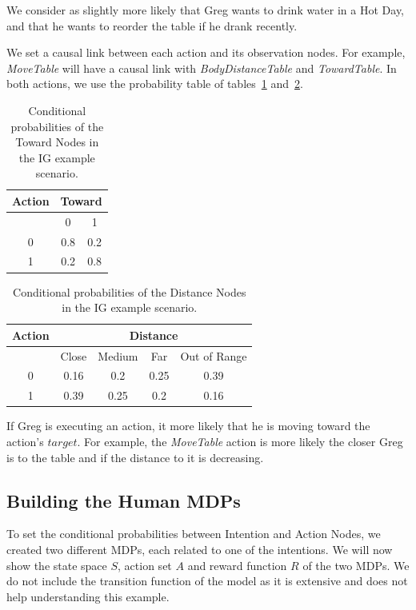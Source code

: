 We consider as slightly more likely that Greg wants to drink water in a Hot Day, and that he wants to reorder the table if he drank recently.

We set a causal link between each action and its observation nodes. For example, \textit{MoveTable} will have a causal link with \textit{BodyDistanceTable} and \textit{TowardTable}. In both actions, we use the probability table of tables~\ref{table:intention-ig_toward} and~\ref{table:intention-ig_distance}.

 \begin{table}[h!]
\centering
\begin{tabular}{|c|c|c|}
\hline
Action & \multicolumn{2}{|c|}{Toward} \\ \hline \hline
& 0 & 1 \\ \hline
0  & 0.8 & 0.2 \\ \hline
1 & 0.2 & 0.8 \\  \hline
\end{tabular}
\caption{Conditional probabilities of the Toward Nodes in the IG example scenario.}
 \label{table:intention-ig_toward}    
\end{table}

 \begin{table}[h!]
\centering
\begin{tabular}{|c|c|c|c|c|}
\hline
Action & \multicolumn{4}{|c|}{Distance} \\ \hline \hline
& Close & Medium & Far & Out of Range \\ \hline
0  & 0.16 & 0.2 & 0.25 & 0.39 \\ \hline
1 & 0.39 & 0.25 & 0.2 & 0.16 \\ \hline
\end{tabular}
\caption{Conditional probabilities of the Distance Nodes in the IG example scenario.}
 \label{table:intention-ig_distance}    
\end{table}

If Greg is executing an action, it  more likely that he is moving toward the action's $target$. For example, the \textit{MoveTable} action is more likely the closer Greg is to the table and if the distance to it is decreasing.

\subsection{Building the Human MDPs}
To set the conditional probabilities between Intention and Action Nodes, we created two different MDPs, each related to one of the intentions. We will now show the state space $S$, action set $A$ and reward function $R$  of the two MDPs. We do not include the transition function of the model as it is extensive and does not help understanding this example.


